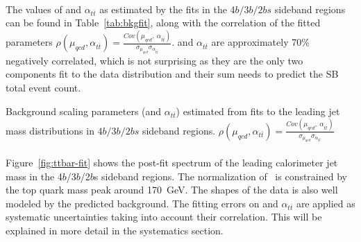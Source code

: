 \paragraph{}
The values of \muqcd and $\alpha_{t\bar{t}}$ as estimated by the fits in the $4b/3b/2bs$ sideband regions can be found in Table~\ref{tab:bkgfit}, along with the correlation of the fitted parameters $\rho(\mu_{qcd},\alpha_{t\bar{t}}) = \frac{Cov(\mu_{qcd},\ \alpha_{t\bar{t}})}{\sigma_{\mu_{qcd}}\sigma_{\alpha_{t\bar{t}}} }$. \muqcd and $\alpha_{t\bar{t}}$ are approximately 70\% negatively correlated, which is not surprising as they are the only two components fit to the data distribution and their sum needs to predict the SB total event count.

\begin{table}[htbp!]
\begin{center}

\caption{Background scaling parameters (\muqcd and $\alpha_{t\bar{t}}$) estimated from fits to the leading jet mass distributions in $4b/3b/2bs$ sideband regions. $\rho(\mu_{qcd},\alpha_{t\bar{t}}) = \frac{Cov(\mu_{qcd},\ \alpha_{t\bar{t}})}{\sigma_{\mu_{qcd}}\sigma_{\alpha_{t\bar{t}}} }$}
\label{tab:bkgfit}
\end{center}
\end{table}

\paragraph{}
Figure~\ref{fig:ttbar-fit} shows the post-fit spectrum of the leading \largeR calorimeter jet mass in the 4$b$/3$b$/2$b$s sideband regions. The normalization of \ttbar\ is 
constrained by the top quark mass peak around 170~GeV. The shapes of the data is also well modeled by the predicted background. The fitting errors on \muqcd and 
$\alpha_{t\bar{t}}$ are applied as systematic uncertainties taking into account their correlation. This will be explained in more detail in the systematics section.

